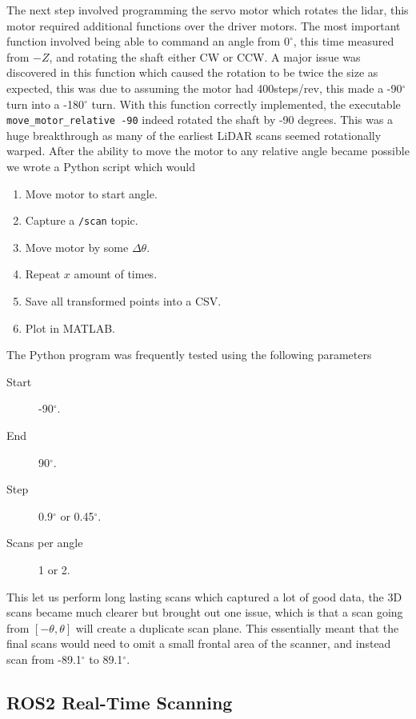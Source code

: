 The next step involved programming the servo motor which rotates the lidar, this motor required additional functions over the driver motors. 
The most important function involved being able to command an angle from \(0^\circ\), this time measured from \(-Z\), and rotating the shaft either CW or CCW.
A major issue was discovered in this function which caused the rotation to be twice the size as expected, this was due to assuming the motor had 400steps/rev, this made a -90\(^\circ\) turn into a -180\(^\circ\) turn.
With this function correctly implemented, the executable \texttt{move\_motor\_relative -90} indeed rotated the shaft by -90 degrees.
This was a huge breakthrough as many of the earliest LiDAR scans seemed rotationally warped.
After the ability to move the motor to any relative angle became possible we wrote a Python script which would
\begin{enumerate}
    \item Move motor to start angle.
    \item Capture a \texttt{/scan} topic.
    \item Move motor by some \(\Delta \theta \).
    \item Repeat \(x\) amount of times.
    \item Save all transformed points into a CSV.
    \item Plot in MATLAB.
\end{enumerate}
The Python program was frequently tested using the following parameters
\begin{description}
    \item [Start] -90\(^\circ\).
    \item [End] 90\(^\circ\).
    \item [Step] 0.9\(^\circ\) or 0.45\(^\circ\).
    \item [Scans per angle] 1 or 2.
\end{description}
This let us perform long lasting scans which captured a lot of good data, the 3D scans became much clearer but brought out one issue, which is that a scan going from \([-\theta, \theta]\) will create a duplicate scan plane.
This essentially meant that the final scans would need to omit a small frontal area of the scanner, and instead scan from -89.1\(^\circ\) to 89.1\(^\circ\).

\subsection{ROS2 Real-Time Scanning}

